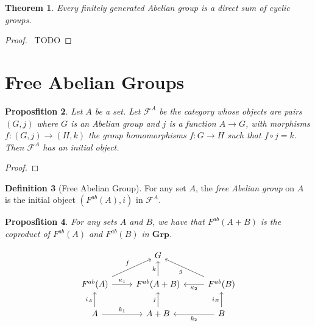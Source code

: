 \documentclass{book}
\let\qed\relax
\newtheorem{prop}{Proposfition}[chapter]
\newtheorem{thm}[prop]{Theorem}
\theoremstyle{definition}
\newtheorem{df}[prop]{Definition}
\newcommand{\Grp}{\ensuremath{\mathbf{Grp}}}
\begin{document}
\begin{thm}
Every finitely generated Abelian group is a direct sum of cyclic groups.
\end{thm}

\begin{proof}
\pf\ TODO \qed
\end{proof}

\section{Free Abelian Groups}

\begin{prop}
    Let $A$ be a set. Let $\mathcal{F}^A$ be the category whose objects are pairs $(G,j)$ where $G$ is an Abelian group and $j$ is a function $A \rightarrow G$, with morphisms $f : (G,j) \rightarrow (H,k)$ the group homomorphisms $f : G \rightarrow H$ such that $f \circ j = k$. Then $\mathcal{F}^A$ has an initial object.
\end{prop}

\begin{proof}
    \pf
    \qed
\end{proof}

\begin{df}[Free Abelian Group]
    For any set $A$, the \emph{free Abelian group} on $A$ is the initial object $(F^{ab}(A),i)$ in $\mathcal{F}^A$.
\end{df}

\begin{prop}
    For any sets $A$ and $B$, we have that $F^{ab}(A+B)$ is the coproduct of $F^{ab}(A)$ and $F^{ab}(B)$ in $\Grp$.
\end{prop}

\[ \begin{tikzcd}
        & G & \\
        F^{ab}(A) \arrow[r,"\kappa_1"] \arrow[ur,"f"] & F^{ab}(A+B) \arrow[u,"k"] & \arrow[l,"\kappa_2"] F^{ab}(B) \arrow[ul,"g"] \\
        A \arrow[r,"k_1"] \arrow[u,"i_A"] & A+B \arrow[u,"j"] & \arrow[l,"k_2"] \arrow[u,"i_B"] B
    \end{tikzcd} \]
\end{document}
